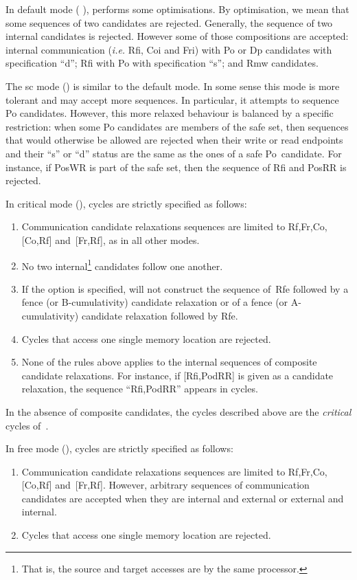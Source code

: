 \label{default:def}In default mode ( ), \diy{} performs some optimisations. By optimisation, we mean that some sequences of two candidates are rejected. Generally, the sequence of  two internal candidates is rejected. However some of those compositions are accepted: internal communication (\emph{i.e.} Rfi, Coi and Fri) with Po or Dp candidates with specification ``d'';
Rfi with Po with specification ``s''; and Rmw candidates.

\label{sc:def}The sc mode () is similar to the default mode. In some sense this mode is more tolerant and may accept more sequences. In particular, it attempts to sequence Po candidates. However, this more relaxed behaviour is balanced by a specific restriction: when some Po candidates are members of the safe set, then sequences that would otherwise be allowed are rejected when their write or read endpoints and their ``s'' or ``d'' status are the same as  the ones of a safe Po~candidate. For instance, if PosWR is part of the safe set, then the sequence of Rfi and PosRR is rejected.

\label{critical:def}%
In critical mode (),  cycles are strictly specified as
follows:
\begin{enumerate}
\item Communication candidate relaxations sequences are
limited to Rf,Fr,Co,[Co,Rf] and~[Fr,Rf], as in all other modes.
\item No two internal\footnote{That is, the source and target
accesses are by the same processor.} candidates follow one another.
\item If the option  is specified,
\diy{} will not construct
the sequence of~Rfe followed by a fence (or B-cumulativity) candidate
relaxation or
of a fence (or A-cumulativity) candidate relaxation followed by Rfe.
\item Cycles that access one single memory location are rejected.
\item None of the rules above applies to the internal sequences of
composite candidate relaxations. For instance, if [Rfi,PodRR]
is given as a candidate relaxation, the sequence ``Rfi,PodRR'' appears
in cycles.
\end{enumerate}
In the absence of composite candidates,
the cycles described above are the \emph{critical} cycles of~\cite{ss88}.

\label{free:def}%
In free mode (), cycles are strictly specified as
follows:
\begin{enumerate}
\item Communication candidate relaxations sequences are
limited to Rf,Fr,Co,[Co,Rf] and~[Fr,Rf]. However, arbitrary sequences
of communication candidates are accepted when they are internal and external
or external and internal.
\item Cycles that access one single memory location are rejected.
\end{enumerate}

